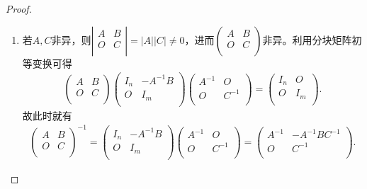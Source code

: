 \documentclass[../../main.tex]{subfiles}
\begin{document}
\begin{proof}
\begin{enumerate}
\item 若\(A,C\)非异，则\(\left| \begin{matrix} A&B\\ O&C\\ \end{matrix} \right|=\left| A \right|\left| C \right|\ne 0\)，进而\(\left( \begin{matrix} A&B\\ O&C\\ \end{matrix} \right)\)非异。利用分块矩阵初等变换可得
\begin{align*}
\left( \begin{matrix} A&B\\ O&C\\ \end{matrix} \right) 
\left( \begin{matrix} I_n&-A^{-1}B\\ O&I_m\\ \end{matrix} \right) 
\left( \begin{matrix} A^{-1}&O\\ O&C^{-1}\\ \end{matrix} \right) 
=
\left( \begin{matrix} I_n&O\\ O&I_m\\ \end{matrix} \right).
\end{align*}
故此时就有
\begin{align*}
\left( \begin{matrix} A&B\\ O&C\\ \end{matrix} \right)^{-1}
=
\left( \begin{matrix} I_n&-A^{-1}B\\ O&I_m\\ \end{matrix} \right) 
\left( \begin{matrix} A^{-1}&O\\ O&C^{-1}\\ \end{matrix} \right) 
=
\left( \begin{matrix} A^{-1}&-A^{-1}BC^{-1}\\ O&C^{-1}\\ \end{matrix} \right).
\end{align*}

\end{enumerate}
\end{proof}
\end{document}
